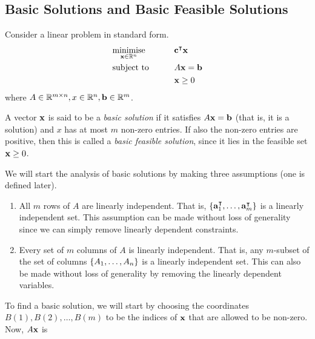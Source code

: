\subsection{Basic Solutions and Basic Feasible Solutions}
Consider a linear problem in standard form.
\begin{alignat*}{2}
    & \underset{\vb x \in \mathbb R^n}{\text{minimise}} & \qquad & \vb c^\intercal \vb x         \\
    & \text{subject to}                                &        & A\vb x = \vb b \\
    & & & \vb x \geq 0
\end{alignat*}
where \( A \in \mathbb R^{m \times n}, x \in \mathbb R^n, \vb b \in \mathbb R^m \).
\begin{definition}
    A vector \( \vb x \) is said to be a \textit{basic solution} if it satisfies \( A \vb x = \vb b \) (that is, it is a solution) and \( x \) has at most \( m \) non-zero entries. If also the non-zero entries are positive, then this is called a \textit{basic feasible solution}, since it lies in the feasible set \( \vb x \geq 0 \).
\end{definition}
\noindent We will start the analysis of basic solutions by making three assumptions (one is defined later).
\begin{enumerate}[A:]
    \item All \( m \) rows of \( A \) are linearly independent. That is, \( \qty{ \vb a_1^\intercal, \dots, \vb a_m^\intercal} \) is a linearly independent set. This assumption can be made without loss of generality since we can simply remove linearly dependent constraints.
    \item Every set of \( m \) columns of \( A \) is linearly independent. That is, any \( m \)-subset of the set of columns \( \qty{ A_1, \dots, A_n } \) is a linearly independent set. This can also be made without loss of generality by removing the linearly dependent variables.
\end{enumerate}
To find a basic solution, we will start by choosing the coordinates \( B(1), B(2), \dots, B(m) \) to be the indices of \( \vb x \) that are allowed to be non-zero. Now, \( A \vb x \) is
